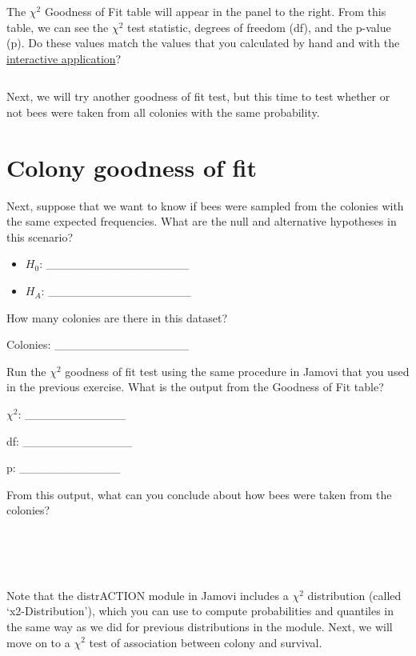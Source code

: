 \documentclass[
]{scrbook}
\begin{document}
The \(\chi^{2}\) Goodness of Fit table will appear in the panel to the right.
From this table, we can see the \(\chi^{2}\) test statistic, degrees of freedom (df), and the p-value (p).
Do these values match the values that you calculated by hand and with the \href{https://bradduthie.shinyapps.io/chi-square/}{interactive application}?

\begin{verbatim}

\end{verbatim}

Next, we will try another goodness of fit test, but this time to test whether or not bees were taken from all colonies with the same probability.

\hypertarget{colony-goodness-of-fit}{%
\section{Colony goodness of fit}\label{colony-goodness-of-fit}}

Next, suppose that we want to know if bees were sampled from the colonies with the same expected frequencies.
What are the null and alternative hypotheses in this scenario?

\begin{itemize}
\item
  \(H_{0}\): \_\_\_\_\_\_\_\_\_\_\_\_\_\_\_\_\_
\item
  \(H_{A}\): \_\_\_\_\_\_\_\_\_\_\_\_\_\_\_\_\_
\end{itemize}

How many colonies are there in this dataset?

Colonies: \_\_\_\_\_\_\_\_\_\_\_\_\_\_\_\_

Run the \(\chi^{2}\) goodness of fit test using the same procedure in Jamovi that you used in the previous exercise.
What is the output from the Goodness of Fit table?

\(\chi^{2}\): \_\_\_\_\_\_\_\_\_\_\_\_

df: \_\_\_\_\_\_\_\_\_\_\_\_\_

p: \_\_\_\_\_\_\_\_\_\_\_\_

From this output, what can you conclude about how bees were taken from the colonies?

\begin{verbatim}




\end{verbatim}

Note that the distrACTION module in Jamovi includes a \(\chi^{2}\) distribution (called `x2-Distribution'), which you can use to compute probabilities and quantiles in the same way as we did for previous distributions in the module.
Next, we will move on to a \(\chi^{2}\) test of association between colony and survival.
\end{document}
